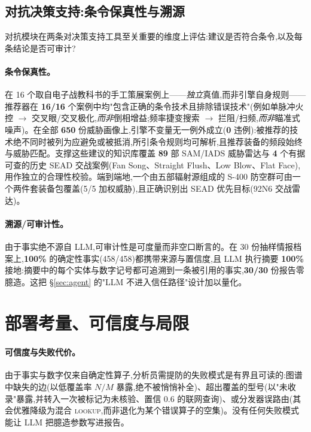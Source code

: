 \documentclass[11pt,a4paper]{article}
\newcommand{\op}[1]{\textsc{\small #1}}
\begin{document}
\subsection{对抗决策支持:条令保真性与溯源}
\label{sec:eval-ew}
对抗模块在两条对决策支持工具至关重要的维度上评估:建议是否符合条令,以及每条结论是否可审计?

\paragraph{条令保真性。} 在 16 个取自电子战教科书的手工策展案例上——\emph{独立}真值,而非引擎自身规则——推荐器在 \textbf{16/16} 个案例中均"包含正确的条令技术且排除错误技术"(例如单脉冲火控 $\to$ 交叉眼/交叉极化,\emph{而非}倒相增益;频率捷变搜索 $\to$ 拦阻/扫频,\emph{而非}瞄准式噪声)。在全部 \textbf{650} 份威胁画像上,引擎不变量无一例外成立(\textbf{0} 违例):被推荐的技术绝不同时被列为应避免或被抵消,所引条令规则均可解析,且推荐装备的频段始终与威胁匹配。支撑这些建议的知识库覆盖 \textbf{89} 部 SAM/IADS 威胁雷达与 \textbf{4} 个有据可查的历史 SEAD 交战案例(Fan Song、Straight Flush、Low Blow、Flat Face),用作独立的合理性校验。端到端地,一个由五部辐射源组成的 S-400 防空群可由一个两件套装备包覆盖(5/5 加权威胁),且正确识别出 SEAD 优先目标(92N6 交战雷达)。

\paragraph{溯源/可审计性。} 由于事实绝不源自 LLM,可审计性是可度量而非空口断言的。在 30 份抽样情报档案上,\textbf{100\%} 的确定性事实(458/458)都携带来源与置信度,且 LLM 执行摘要 \textbf{100\%} 接地:摘要中的每个实体与数字记号都可追溯到一条被引用的事实,\textbf{30/30} 份报告零臆造。这把 \S\ref{sec:agent} 的"LLM 不进入信任路径"设计加以量化。

\section{部署考量、可信度与局限}
\label{sec:deploy}

\paragraph{可信度与失败代价。}
由于事实与数字仅来自确定性算子,分析员需提防的失败模式是有界且可读的:图谱中缺失的边(以低覆盖率 $N/M$ 暴露,绝不被悄悄补全)、超出覆盖的型号(以"未收录"暴露,并转入一次被标记为未核验、置信 0.6 的联网查询)、或分发器误路由(其会优雅降级为混合 \op{lookup},而非退化为某个错误算子的空集)。没有任何失败模式能让 LLM 把臆造参数写进报告。
\end{document}
